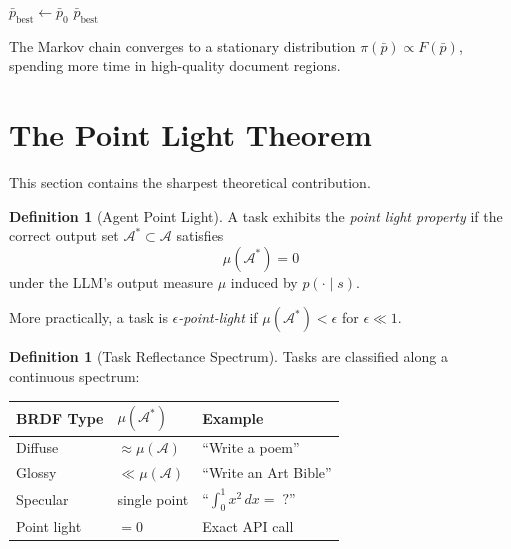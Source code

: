 \documentclass[11pt,twocolumn]{article}
\theoremstyle{definition}
\newtheorem{definition}[theorem]{Definition}
\newcommand{\Aspace}{\mathcal{A}}
\newcommand{\Astar}{\mathcal{A}^{\ast}}
\begin{document}
\begin{algorithm}[H]
\SetAlgoLined
{}
$\bar{p}_{\text{best}} \leftarrow \bar{p}_0$\;
\Return $\bar{p}_{\text{best}}$\;
\caption{Agent MLT for Document Refinement}
\label{alg:mlt}
\end{algorithm}

The Markov chain converges to a stationary distribution $\pi(\bar{p}) \propto F(\bar{p})$,
spending more time in high-quality document regions.

\section{The Point Light Theorem}\label{sec:point-light}

This section contains the sharpest theoretical contribution.

\begin{definition}[Agent Point Light]\label{def:point-light}
A task exhibits the \emph{point light property} if the correct output set
$\Astar \subset \Aspace$ satisfies
\begin{equation}
  \mu(\Astar) = 0
\end{equation}
under the LLM's output measure $\mu$ induced by $p(\cdot \mid s)$.

More practically, a task is \emph{$\epsilon$-point-light} if
$\mu(\Astar) < \epsilon$ for $\epsilon \ll 1$.
\end{definition}

\begin{definition}[Task Reflectance Spectrum]\label{def:spectrum}
Tasks are classified along a continuous spectrum:

\begin{center}
\begin{tabular}{@{}lll@{}}
\toprule
BRDF Type & $\mu(\Astar)$ & Example \\
\midrule
Diffuse & $\approx \mu(\Aspace)$ & ``Write a poem'' \\
Glossy & $\ll \mu(\Aspace)$ & ``Write an Art Bible'' \\
Specular & single point & ``$\int_0^1 x^2\,dx = \;?$'' \\
Point light & $= 0$ & Exact API call \\
\bottomrule
\end{tabular}
\end{center}
\end{definition}
\end{document}
